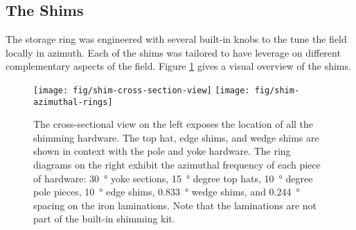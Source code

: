 


\subsection{The Shims}

The storage ring was engineered with several built-in knobs to the tune the field locally in azimuth.  Each of the shims was tailored to have leverage on different complementary aspects of the field. Figure \ref{fig:shim-cross-section-view} gives a visual overview of the shims.

\begin{figure}
\centering
\texttt{[image: fig/shim-cross-section-view]}
\texttt{[image: fig/shim-azimuthal-rings]}
\caption{
    The cross-sectional view on the left exposes the location of all the shimming hardware.  The top hat, edge shims, and wedge shims are shown in context with the pole and yoke hardware.  The ring diagrams on the right exhibit the azimuthal frequency of each piece of hardware: \SI{30}{\degree} yoke sections, \SI{15}{\degree} degree top hats, \SI{10}{\degree} degree pole pieces, \SI{10}{\degree} edge shims, \SI{0.833}{\degree} wedge shims, and \SI{0.244}{\degree} spacing on the iron laminations.  Note that the laminations are not part of the built-in shimming kit. 
    \label{fig:shim-cross-section-view}
}
\end{figure}

